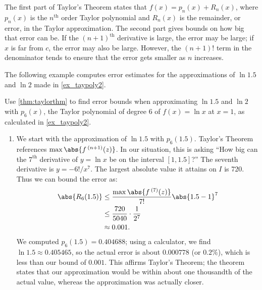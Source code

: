 The first part of Taylor's Theorem states that $f(x) = p_n(x) + R_n(x)$, where $p_n(x)$ is the $n^\text{th}$ order Taylor polynomial and $R_n(x)$ is the remainder, or error, in the Taylor approximation. The second part gives bounds on how big that error can be. If the $(n+1)^\text{th}$ derivative is large, the error may be large; if $x$ is far from $c$, the error may also be large. However, the $(n+1)!$ term in the denominator tends to ensure that the error gets smaller as $n$ increases.

The following example computes error estimates for the approximations of $\ln 1.5$ and $\ln 2$ made in \autoref{ex_taypoly2}.

\begin{example}\label{ex_taypoly3}
Use \autoref{thm:taylorthm} to find error bounds when approximating $\ln 1.5$ and $\ln 2$ with $p_6(x)$, the Taylor polynomial of degree 6 of $f(x)=\ln x$ at $x=1$, as calculated in \autoref{ex_taypoly2}.
\solution
\begin{enumerate}
\item	We start with the approximation of $\ln 1.5$ with $p_6(1.5)$.
%
Taylor's Theorem references $\max\abs{f\,^{(n+1)}(z)}$. In our situation, this is asking ``How big can the $7^\text{th}$ derivative of $y=\ln x$ be on the interval $[1,1.5]$?'' The seventh derivative is $y = -6!/x^7$. The largest absolute value it attains on $I$ is 720. Thus we can bound the error as:
\begin{align*}
	\abs{R_6(1.5)}
	&\leq \frac{\max\abs{f\,^{(7)}(z)}}{7!}\abs{1.5-1}^7\\
	&\leq \frac{720}{5040}\cdot\frac1{2^7}\\
	&\approx 0.001.
\end{align*}
We computed $p_6(1.5) = 0.404688$; using a calculator, we find $\ln 1.5 \approx 0.405465$, so the actual error is about $0.000778$ (or $0.2\%$), which is less than our bound of $0.001$. This affirms Taylor's Theorem; the theorem states that our approximation would be within about one thousandth of the actual value, whereas the approximation was actually closer.


\end{enumerate}
\end{example}
